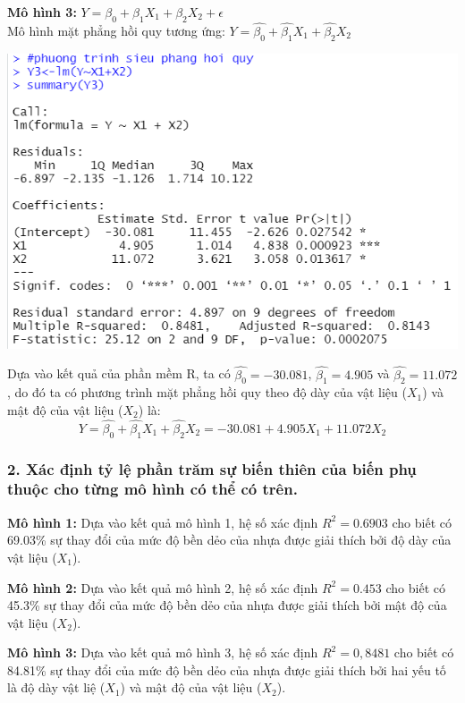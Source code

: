 \documentclass[a4paper]{article}
\theoremstyle{nonumberplain}
\begin{document}
\textbf{Mô hình 3:} $Y= \beta_0 + \beta_1 X_1 + \beta_2 X_2+ \epsilon$\\
Mô hình mặt phẳng hồi quy tương ứng: $Y= \hat{\beta_0} + \hat{\beta_1} X_1 + \hat{\beta_2} X_2$
\begin{center}
\includegraphics[scale =0.9]{bai2_1iii.PNG} 
\end{center}
Dựa vào kết quả của phần mềm R, ta có $\hat{\beta_0} = -30.081$, $\hat{\beta_1} = 4.905$ và $\hat{\beta_2} = 11.072$ , do đó ta có phương trình mặt phẳng hồi quy theo độ dày của vật liệu ($X_1$) và mật độ của vật liệu ($X_2$) là:
$$Y =   \hat{\beta_0} + \hat{\beta_1} X_1 + \hat{\beta_2} X_2 = -30.081 + 4.905 X_1 + 11.072 X_2$$

\subsubsection*{2. Xác định tỷ lệ phần trăm sự biến thiên của biến phụ thuộc cho từng mô hình có thể có trên.}

\textbf{Mô hình 1:} Dựa vào kết quả mô hình 1, hệ số xác định $R^2= 0.6903$ cho biết có 69.03\% sự thay
đổi của mức độ bền dẻo của nhựa được giải thích bởi độ dày của vật liệu ($X_1$).

\textbf{Mô hình 2:} Dựa vào kết quả mô hình 2, hệ số xác định $R^2= 0.453$ cho biết có 45.3\% sự thay
đổi của mức độ bền dẻo của nhựa được giải thích bởi mật độ của vật liệu  ($X_2$).

\textbf{Mô hình 3:} Dựa vào kết quả mô hình 3, hệ số xác định $R^2= 0,8481$ cho biết có 84.81\% sự thay
đổi của mức độ bền dẻo của nhựa được giải thích bởi hai yếu tố là độ dày vật liệ ($X_1$) và mật độ của vật liệu  ($X_2$).
\end{document}

